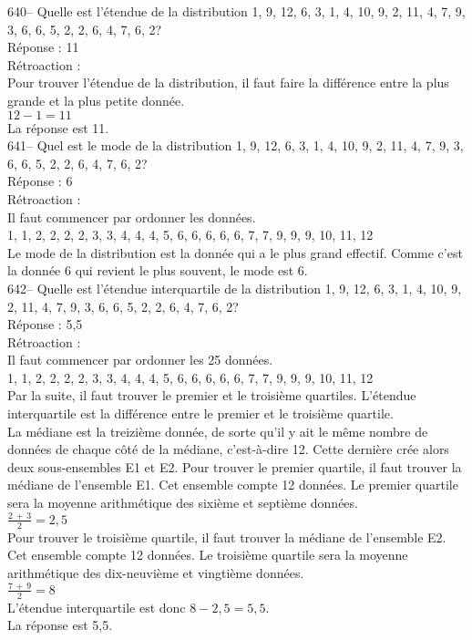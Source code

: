 ﻿\documentclass[letterpaper, 12pt]{article}
\begin{document}
640-- Quelle est l'\'etendue de la distribution 1, 9, 12, 6, 3, 1, 4, 10, 9,
2, 11, 4, 7, 9, 3, 6, 6, 5, 2, 2, 6, 4, 7, 6, 2?\\

R\'eponse : 11\\

R\'etroaction : \\
Pour trouver l'\'etendue de la distribution, il faut faire la diff\'erence
entre la plus grande et la plus petite donn\'ee.  \\
$12-1=11$\\
La r\'eponse est 11.\\

641-- Quel est le mode de la distribution 1, 9, 12, 6, 3, 1, 4, 10, 9, 2,
11, 4, 7, 9, 3, 6, 6, 5, 2, 2, 6, 4, 7, 6, 2?\\

R\'eponse : 6\\

R\'etroaction : \\
Il faut commencer par ordonner les donn\'ees.\\
1, 1, 2, 2, 2, 2, 3, 3, 4, 4, 4, 5, 6, 6, 6, 6, 6, 7, 7, 9, 9, 9, 10, 11,
12\\
Le mode de la distribution est la donn\'ee qui a le plus grand effectif.
Comme c'est la donn\'ee 6 qui revient le plus souvent, le mode est 6.\\


642--  Quelle est l'\'etendue interquartile de la distribution 1, 9, 12, 6,
3, 1, 4, 10, 9, 2, 11, 4, 7, 9, 3, 6, 6, 5, 2, 2, 6, 4, 7, 6, 2?\\

R\'eponse : 5,5\\

R\'etroaction : \\
Il faut commencer par ordonner les 25 donn\'ees.\\
1, 1, 2, 2, 2, 2, 3, 3, 4, 4, 4, 5, 6, 6, 6, 6, 6, 7, 7, 9, 9, 9, 10, 11,
12\\
Par la suite, il faut trouver le premier et le troisi\`eme quartiles.
L'\'etendue interquartile est la diff\'erence entre le premier et le
troisi\`eme quartile.\\
La m\'ediane est la treizi\`eme donn\'ee, de sorte qu'il y ait le m\^eme
nombre de donn\'ees de chaque c\^ot\'e de la m\'ediane, c'est-\`a-dire 12.
Cette derni\`ere cr\'ee alors deux sous-ensembles E1 et E2.  Pour trouver le
premier quartile, il faut trouver la m\'ediane de l'ensemble E1.  Cet
ensemble compte 12 donn\'ees.  Le premier quartile sera la moyenne
arithm\'etique des sixi\`eme et septi\`eme donn\'ees. \\[2mm]
$\frac{2\,+\,3}{2}=2,5$\\[2mm]
Pour trouver le troisi\`eme quartile, il faut trouver la m\'ediane de
l'ensemble E2.  Cet ensemble compte 12 donn\'ees.  Le troisi\`eme quartile
sera la moyenne arithm\'etique des dix-neuvi\`eme et vingti\`eme donn\'ees.
\\[2mm]
$\frac{7\,+\,9}{2}=8$\\[2mm]
L'\'etendue interquartile est donc $8-2,5=5,5$.\\[2mm]
La r\'eponse est 5,5.\\
\end{document}
